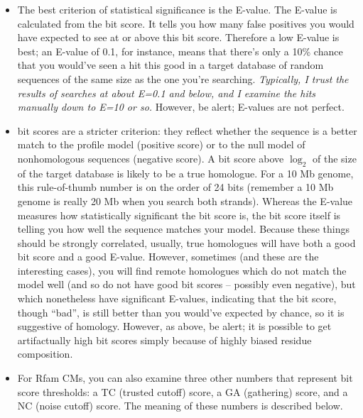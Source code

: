\begin{itemize}
\item The best criterion of statistical significance is the E-value.
The E-value is calculated from the bit score. It tells you how many
false positives you would have expected to see at or above this bit
score. Therefore a low E-value is best; an E-value of 0.1, for
instance, means that there's only a 10\% chance that you would've seen
a hit this good in a target database of random sequences of the same
size as the one you're searching. {\em
Typically, I trust the results of searches at about E=0.1 and below,
and I examine the hits manually down to E=10 or so.}  However, be
alert;  E-values are not perfect.

\item {} bit scores are a stricter criterion: they
  reflect whether the sequence is a better match to the profile model
  (positive score) or to the null model of nonhomologous sequences
  (negative score).  A bit score above $\log_2$ of the size of the
  target database is likely to be a true
  homologue. For a 10 Mb genome, this rule-of-thumb number is on
  the order of 24 bits (remember a 10 Mb genome is really 20 Mb when
  you search both strands).  Whereas the E-value measures how
  statistically significant the bit score is, the bit score itself is
  telling you how well the sequence matches your model. Because these
  things should be strongly correlated, usually, true homologues will
  have both a good bit score and a good E-value. However, sometimes
  (and these are the interesting cases), you will find remote
  homologues which do not match the model well (and so do not have
  good bit scores -- possibly even negative), but which nonetheless
  have significant E-values, indicating that the bit score, though
  ``bad'', is still better than you would've expected by chance, so it
  is suggestive of homology. However, as above, be alert; it is
  possible to get artifactually high bit scores simply because of
  highly biased residue composition.
  
\item For Rfam CMs, you can also examine three other numbers that
  represent bit score thresholds: a TC (trusted cutoff) score, a GA
(gathering) score, and a NC (noise cutoff) score. The meaning of
these numbers is described below.
\end{itemize}

